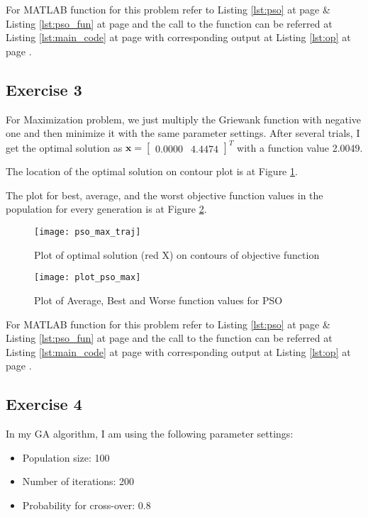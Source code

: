 \documentclass[11pt]{article}
\newcommand{\V}[1]{\pmb{#1}}
\newcommand{\mat}[1]{\begin{bmatrix}#1\end{bmatrix}}
\newcommand{\reflst}[1]{Listing \ref{#1} at page \pageref{#1}}
\newcommand{\reffig}[1]{Figure \ref{#1}}
\begin{document}
\noindent For MATLAB function for this problem refer to \reflst{lst:pso} \& \reflst{lst:pso_fun} and the call to the function can be referred at \reflst{lst:main_code} with corresponding output at \reflst{lst:op}.
%
\clearpage
\vspace{2ex}
%
\subsection*{Exercise 3}
For Maximization problem, we just multiply the Griewank function with negative one and then minimize it with the same parameter settings. After several trials, I get the optimal solution as $\V{x}=\mat{   0.0000 &    4.4474}^T$ with a function value 2.0049. 

\noindent The location of the optimal solution on contour plot is at \reffig{fig:pso_max_cont}.

\noindent The plot for best, average, and the worst objective function values in the population for every generation is at \reffig{fig:pso_max}.

\begin{figure}[!h]
 \centering
 \texttt{[image: pso\_max\_traj]}
 \caption{Plot of optimal solution (red X) on contours of objective function}
 \label{fig:pso_max_cont}
\end{figure}

\begin{figure}[!h]
 \centering
 \texttt{[image: plot\_pso\_max]}
 \caption{Plot of Average, Best and Worse function values for PSO}
 \label{fig:pso_max}
\end{figure}



\noindent For MATLAB function for this problem refer to \reflst{lst:pso} \& \reflst{lst:pso_fun} and the call to the function can be referred at \reflst{lst:main_code} with corresponding output at \reflst{lst:op}.
%
\clearpage
\vspace{2ex}
\subsection*{Exercise 4} 
In my GA algorithm, I am using the following parameter settings:
\begin{itemize}
 \item Population size: 100
 \item Number of iterations: 200
 \item Probability for cross-over: 0.8
\end{itemize}
\end{document}
